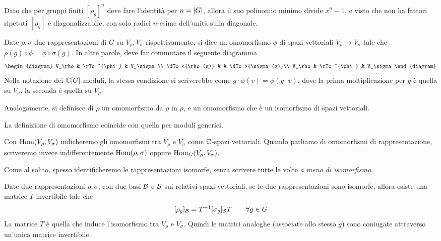 	Dato che per gruppi finiti $[\rho_g]^n$ deve fare l'identità per $n=\left|G\right|$, allora il suo polinomio minimo divide $x^n-1$, e visto che non ha fattori ripetuti $[\rho_g]$ è diagonalizzabile, con solo radici $n$-esime dell'unità sulla diagonale. 

	\begin{mydef}
		Date $\rho,\sigma$ due rappresentazioni di $G$ su $V_\rho,V_\sigma$ rispettivamente, si dice  un omomorfismo $\phi$ di spazi vettoriali $V_\rho \rightarrow V_\sigma$ tale che $\rho(g) \circ \phi = \phi \circ \sigma(g)$. 
		In altre parole, deve far commutare il seguente diagramma
		\[
			\begin{diagram}
	V_\rho         & \rTo^{\phi}  & V_\sigma\\
	\dTo<{\rho(g)} &           	 & \dTo>{\sigma(g)}\\
	V_\rho         & \rTo^{\phi}  & V_\sigma
			\end{diagram}
		\]
		Nella notazione dei $\mathbb C[G]$-moduli, la stessa condizione si scriverebbe come $g\cdot \phi(v)=\phi(g\cdot v)$, dove la prima moltiplicazione per $g$ è quella su $V_\sigma$, la seconda è quella su $V_\rho$.
			
	Analogamente, si definisce  di $\rho$ un omomorfismo da $\rho$ in $\rho$, e  un omomorfismo che è un isomorfismo di spazi vettoriali.
	\end{mydef}

	\begin{myobs}
		La definizione di omomorfismo coincide con quella per moduli generici.
	\end{myobs}

	\begin{myobs}
		Con $\operatorname{Hom}(V_\rho,V_\sigma)$ indicheremo gli omomorfismi tra $V_\rho$ e $V_\sigma$ come $\mathbb C$-spazi vettoriali. Quando parliamo di omomorfismi di rappresentazione, scriveremo invece indifferentemente $\operatorname{Hom}(\rho,\sigma)$ oppure $\operatorname{Hom}_G(V_\rho,V_\sigma)$.
	\end{myobs}

	Come al solito, spesso identificheremo le rappresentazioni isomorfe, senza scrivere tutte le volte \emph{a meno di isomorfismo}.

	Date due rappresentazioni $\rho,\sigma$, con due basi $\mathcal B$ e $\mathcal S$ sui relativi spazi vettoriali, se le due rappresentazioni sono isomorfe, allora esiste una matrice $T$ invertibile tale che
	\[
		[\rho_g]_\mathcal B = T^{-1} [\sigma_g]_\mathcal S T \qquad \forall g\in G
	\]
	La matrice $T$ è quella che induce l'isomorfismo tra $V_\rho$ e $V_\sigma$.
	Quindi le matrici analoghe (associate allo stesso $g$) sono coniugate attraverso un'unica matrice invertibile.
			
